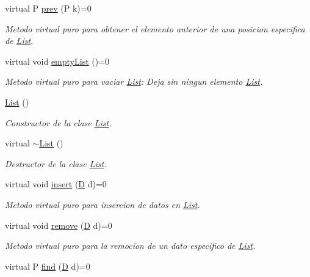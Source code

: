 \begin{DoxyCompactItemize}
virtual P \hyperlink{class_list_acc1831ae92a288345ef20cb29f3846b2}{prev} (P k)=0
\begin{DoxyCompactList}\small\item\em Metodo virtual puro para obtener el elemento anterior de una posicion especifica de \hyperlink{class_list}{List}. \end{DoxyCompactList}\item 
virtual void \hyperlink{class_list_a24b4f177a70215980e81ef7b2981fa1e}{empty\+List} ()=0
\begin{DoxyCompactList}\small\item\em Metodo virtual puro para vaciar \hyperlink{class_list}{List}\+: Deja sin ningun elemento \hyperlink{class_list}{List}. \end{DoxyCompactList}\item 
\hyperlink{class_list_a3deb54ab4f51c6c39aa4015f258b5812}{List} ()
\begin{DoxyCompactList}\small\item\em Constructor de la clase \hyperlink{class_list}{List}. \end{DoxyCompactList}\item 
virtual \hyperlink{class_list_a624593fb77847bf7ad4cacfba3442471}{$\sim$\+List} ()
\begin{DoxyCompactList}\small\item\em Destructor de la clase \hyperlink{class_list}{List}. \end{DoxyCompactList}\item 
virtual void \hyperlink{class_list_a01f588d87d47f8332928eca38f7b11bb}{insert} (\hyperlink{gwp_2main_8cpp_af316c33cc298530f245e8b55330e86b5}{D} d)=0
\begin{DoxyCompactList}\small\item\em Metodo virtual puro para insercion de datos en \hyperlink{class_list}{List}. \end{DoxyCompactList}\item 
virtual void \hyperlink{class_list_a14fc4e853102018df78db3899aa00d71}{remove} (\hyperlink{gwp_2main_8cpp_af316c33cc298530f245e8b55330e86b5}{D} d)=0
\begin{DoxyCompactList}\small\item\em Metodo virtual puro para la remocion de un dato especifico de \hyperlink{class_list}{List}. \end{DoxyCompactList}\item 
virtual P \hyperlink{class_list_a2b40d6fffc7b2fb5138b648f52c839ee}{find} (\hyperlink{gwp_2main_8cpp_af316c33cc298530f245e8b55330e86b5}{D} d)=0

\end{DoxyCompactItemize}
